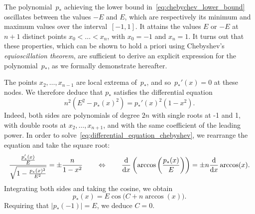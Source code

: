 \begin{remark}
    \label{remark:cheb}
    The polynomial~$p_*$ achieving the lower bound in~\eqref{eq:chebychev_lower_bound}
    oscillates between the values $-E$ and $E$,
    which are respectively its minimum and maximum values over the interval~$[-1, 1]$.
    It attains the values $E$ or $-E$ at $n+1$ distinct points $x_0 < \dotsc < x_n$,
    with $x_0 = -1$ and $x_n = 1$.
    It turns out that these properties,
    which can be shown to hold a priori using Chebyshev's \emph{equioscillation theorem},
    are sufficient to derive an explicit expression for the polynomial~$p_*$,
    as we formally demonstrate hereafter.

    The points $x_2, \dotsc, x_{n-1}$
    are local extrema of~$p_*$,
    and so~$p_*'(x) = 0$ at these nodes.
    We therefore deduce that $p_*$ satisfies the differential equation
    \begin{equation}
        \label{eq:differential_equation_chebyshev}
        n^2\left(E^2 - p_*(x)^2\right) = p_*'(x)^2 (1 - x^2).
    \end{equation}
    Indeed, both sides are polynomials of degree $2n$ with single roots at -1 and 1,
    with double roots at $x_2, \dotsc, x_{n+1}$,
    and with the same coefficient of the leading power.
    In order to solve~\eqref{eq:differential_equation_chebyshev},
    we rearrange the equation and take the square root:
    \[
        \frac{\frac{p_*'(x)}{E}}{\sqrt{1 - \frac{p_*(x)^2}{E^2}}} = \pm \frac{n}{1 - x^2}
        \qquad \Leftrightarrow \qquad
        \frac{\mathrm d}{\mathrm d x} \left( \arccos\left(\frac{p_*(x)}{E}\right) \right) = \pm n \frac{\mathrm d}{\mathrm d x} \arccos(x).
    \]
    Integrating both sides and taking the cosine,
    we obtain
    \[
        p_*(x) = E \cos\bigl(C + n \arccos(x)\bigr).
    \]
    Requiring that $|p_*(-1)| = E$, we deduce $C = 0$.
\end{remark}

